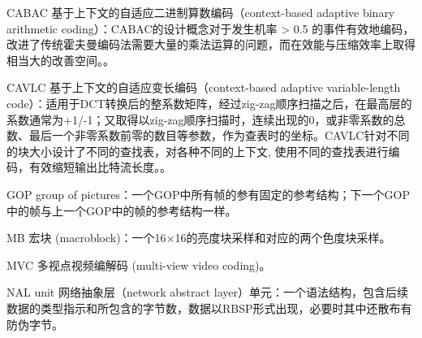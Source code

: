 \begin{denotation}

\item[CABAC] 基于上下文的自适应二进制算数编码（context-based adaptive binary arithmetic coding）：CABAC的设计概念对于发生机率 > 0.5 的事件有效地编码，改进了传统霍夫曼编码法需要大量的乘法运算的问题，而在效能与压缩效率上取得相当大的改善空间。。
\item[CAVLC] 基于上下文的自适应变长编码（context-based adaptive variable-length code）：适用于DCT转换后的整系数矩阵，经过zig-zag顺序扫描之后，在最高层的系数通常为+1/-1；又取得以zig-zag顺序扫描时，连续出现的0，或非零系数的总数、最后一个非零系数前零的数目等参数，作为查表时的坐标。CAVLC针对不同的块大小设计了不同的查找表，对各种不同的上下文, 使用不同的查找表进行编码，有效缩短输出比特流长度。。

\item[GOP]	group of pictures：一个GOP中所有帧的参有固定的参考结构；下一个GOP中的帧与上一个GOP中的帧的参考结构一样。

\item[MB]	宏块 (macroblock)：一个16$\times$16的亮度块采样和对应的两个色度块采样。

\item[MVC]	多视点视频编解码 (multi-view video coding)。

\item[NAL unit] 网络抽象层（network abstract layer）单元：一个语法结构，包含后续数据的类型指示和所包含的字节数，数据以RBSP形式出现，必要时其中还散布有防伪字节。

%
%
%

\end{denotation}
